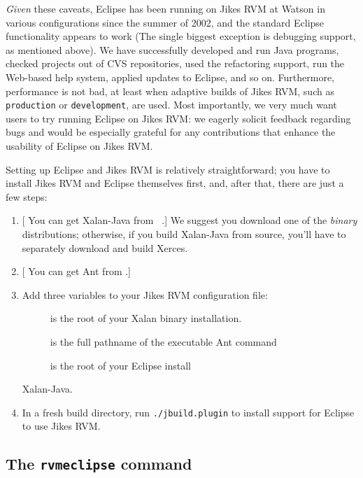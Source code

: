 {\it Given} these caveats, Eclipse has been running on Jikes RVM at
Watson in various configurations since the summer of 2002, and the
standard Eclipse functionality appears to work (The single biggest
exception is debugging support, as mentioned above).  We have
successfully developed and run Java programs, checked projects out of
CVS repositories, used the refactoring support, run the Web-based help
system, applied updates to Eclipse, and so on.  Furthermore,
performance is not bad, at least when adaptive builds of Jikes RVM,
such as {\tt production} or {\tt development}, are used.  Most
importantly, we very much want users to try running Eclipse on Jikes
RVM: we eagerly solicit feedback regarding bugs and would be
especially grateful for any contributions that enhance the usability
of Eclipse on Jikes RVM.\@

Setting up Eclipse and Jikes RVM is relatively straightforward; you
have to install Jikes RVM and Eclipse themselves first, and, after
that, there are just a few steps:
\begin{enumerate}
\item {}[  You can get Xalan-Java from {\tt
\xalanURL}.]{\xalanURL}  We suggest you download one of the {\it binary}
distributions; otherwise, if you build Xalan-Java from source,  you'll have to
separately download and build Xerces.
\item {}[  You can get Ant from {\tt \antURL}.]{\antURL} 
\item Add three variables to your Jikes RVM configuration file:
 \begin{description}
 \item[] is the root of your Xalan binary
 installation.  
 \item[] is the full pathname of the executable Ant command
 \item[] is the root of your Eclipse install
 \end{description}
 Xalan-Java.
\item In a fresh build directory, run {\tt ./jbuild.plugin} to install
support for Eclipse to use Jikes RVM.\@
\end{enumerate}

\subsection{The {\tt rvmeclipse} command}

